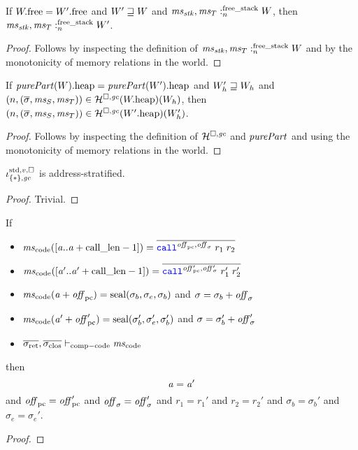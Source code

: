 \begin{lemma}
  \label{lem:stack-sat-unchanged-future}
  If $\pwfree = \pwfree[W']$ and $W' \future W$ and
  $\memSatFStack{\ms_\stk,\ms_T}{W}$, then $\memSatFStack{\ms_\stk,\ms_T}{W'}$.
\end{lemma}
\begin{proof}
  Follows by inspecting the definition of $\memSatFStack{\ms_\stk,\ms_T}{W}$ and by the monotonicity of memory relations in the world.
\end{proof}

\begin{lemma}
  \label{lem:heap-sat-unchanged-future}
  If $\pwheap[\purePart{W}] = \pwheap[\purePart{W'}]$ and $W_{h}' \future W_h$ and $\npair{(\overline{\sigma},\ms_S,\ms_T)} \in \lrheap(\pwheap[W])(W_h)$, then $\npair{(\overline{\sigma},\ms_S,\ms_T)} \in\lrheap(\pwheap[W'])(W_h')$.
\end{lemma}
\begin{proof}
  Follows by inspecting the definition of $\lrheap$ and $\purePart{}$ and using the monotonicity of memory relations in the world.
\end{proof}

\begin{lemma}
  \label{lem:stdreg-singleton-addr-strat}
  $\stdreg{\{*\},\gc}{v}$ is address-stratified.
\end{lemma}
\begin{proof}
  Trivial.
\end{proof}

\begin{lemma}
  \label{lem:unique-ret-seals}
  If
  \begin{itemize}
  \item $\mscode([\aaddr..\aaddr+\calllen-1]) = \overline{\scall{\offpc,\offsigma}{r_1}{r_2}}$
  \item $\mscode([\aaddr'..\aaddr'+\calllen-1]) = \overline{\scall{\offpc',\offsigma'}{r_1'}{r_2'}}$
  \item $\mscode(\aaddr + \offpc) = \seal{\sigma_b,\sigma_e,\sigma_b}$ and $\sigma = \sigma_b + \offsigma$
  \item $\mscode(\aaddr' + \offpc') = \seal{\sigma_b',\sigma_e',\sigma_b'}$ and $\sigma = \sigma_b' + \offsigma'$
  \item $\sigrets,\sigcloss \vdash_{\mathrm{comp-code}} \mscode$
  \end{itemize}
  then
  \[
    \aaddr = \aaddr'
  \]
  and $\offpc = \offpc'$ and $\offsigma = \offsigma'$ and $r_1 = r_1'$ and $r_2 = r_2'$ and $\sigma_b = \sigma_b'$ and $\sigma_e = \sigma_e'$.
\end{lemma}
\begin{proof}
\end{proof}

